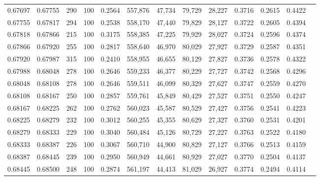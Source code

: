 \begin{tabular}{rrrrrrrrrrrrr}
0.67697 & 0.67755 &   290 & 100 &                                     0.2564 & 557,876 &  47,734 &  79,729 &  28,227 & 0.3716 & 0.2615 & 0.4422 \\
0.67755 & 0.67817 &   294 & 100 &                                     0.2538 & 558,170 &  47,440 &  79,829 &  28,127 & 0.3722 & 0.2605 & 0.4394 \\
0.67818 & 0.67866 &   215 & 100 &                                     0.3175 & 558,385 &  47,225 &  79,929 &  28,027 & 0.3724 & 0.2596 & 0.4374 \\
0.67866 & 0.67920 &   255 & 100 &                                     0.2817 & 558,640 &  46,970 &  80,029 &  27,927 & 0.3729 & 0.2587 & 0.4351 \\
0.67920 & 0.67987 &   315 & 100 &                                     0.2410 & 558,955 &  46,655 &  80,129 &  27,827 & 0.3736 & 0.2578 & 0.4322 \\
0.67988 & 0.68048 &   278 & 100 &                                     0.2646 & 559,233 &  46,377 &  80,229 &  27,727 & 0.3742 & 0.2568 & 0.4296 \\
0.68048 & 0.68108 &   278 & 100 &                                     0.2646 & 559,511 &  46,099 &  80,329 &  27,627 & 0.3747 & 0.2559 & 0.4270 \\
0.68108 & 0.68167 &   250 & 100 &                                     0.2857 & 559,761 &  45,849 &  80,429 &  27,527 & 0.3751 & 0.2550 & 0.4247 \\
0.68167 & 0.68225 &   262 & 100 &                                     0.2762 & 560,023 &  45,587 &  80,529 &  27,427 & 0.3756 & 0.2541 & 0.4223 \\
0.68225 & 0.68279 &   232 & 100 &                                     0.3012 & 560,255 &  45,355 &  80,629 &  27,327 & 0.3760 & 0.2531 & 0.4201 \\
0.68279 & 0.68333 &   229 & 100 &                                     0.3040 & 560,484 &  45,126 &  80,729 &  27,227 & 0.3763 & 0.2522 & 0.4180 \\
0.68333 & 0.68387 &   226 & 100 &                                     0.3067 & 560,710 &  44,900 &  80,829 &  27,127 & 0.3766 & 0.2513 & 0.4159 \\
0.68387 & 0.68445 &   239 & 100 &                                     0.2950 & 560,949 &  44,661 &  80,929 &  27,027 & 0.3770 & 0.2504 & 0.4137 \\
0.68445 & 0.68500 &   248 & 100 &                                     0.2874 & 561,197 &  44,413 &  81,029 &  26,927 & 0.3774 & 0.2494 & 0.4114 \\

\end{tabular}
